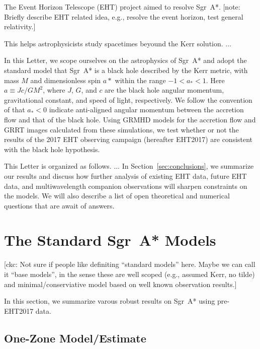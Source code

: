 \documentclass[twocolumn,tighten,dvipsnames]{aastex63}
\newcommand\sgra{Sgr~A*\xspace}
\newcommand\<{{\langle}}
\renewcommand\>{{\rangle}} %
\newcommand\note[1]{{\color{OliveGreen}[note: #1]}}
\newcommand\ckc[1]{{\color{MidnightBlue}[ckc: #1]}}
\begin{document}
The Event Horizon Telescope (EHT) project aimed to resolve \sgra.
\note{Briefly describe EHT related idea, e.g., resolve the event
  horizon, test general relativity.}

This helps astrophysicists study spacetimes beyound the Kerr solution.
...

In this Letter, we scope ourselves on the astrophysics of \sgra and
adopt the standard model that \sgra is a black hole described by the
Kerr metric, with mass $M$ and dimensionless spin $a*$ within the
range $-1 < a_* < 1$.
Here $a \equiv Jc/GM^2$, where $J$, $G$, and $c$ are the black hole
angular momentum, gravitational constant, and speed of light,
respectively.
We follow the convention of \citep{2019ApJ...875L...5E} that $a_* < 0$
indicate anti-aligned angular momentum between the accretion flow and
that of the black hole.
Using GRMHD models for the accretion flow and GRRT images calculated
from these simulations, we test whether or not the results of the 2017
EHT observing campaign (hereafter EHT2017) are consistent with the
black hole hypothesis.

This Letter is organized as follows.
...
In Section~\ref{sec:conclusions}, we summarize our results and discuss
how further analysis of existing EHT data, future EHT data, and
multiwavelength companion observations will sharpen constraints on the
models.
We will also describe a list of open theoretical and numerical
questions that are await of answers.

\section{The Standard \sgra Models}
\label{sec:basemodels}

\ckc{Not sure if people like definiting ``standard models'' here.
  Maybe we can call it ``base models'', in the sense these are well
  scoped (e.g., assumed Kerr, no tilde) and minimal/conserviative
  model based on well known observation results.}

In this section, we summarize varous robust results on \sgra using
pre-EHT2017 data.

\subsection{One-Zone Model/Estimate}
\end{document}
